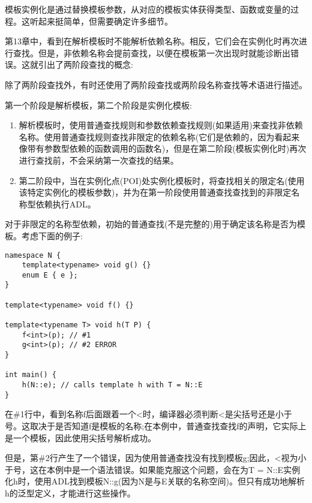 
模板实例化是通过替换模板参数，从对应的模板实体获得类型、函数或变量的过程。这听起来挺简单，但需要确定许多细节。


第13章中，看到在解析模板时不能解析依赖名称。相反，它们会在实例化时再次进行查找。但是，非依赖名称会提前查找，以便在模板第一次出现时就能诊断出错误。这就引出了两阶段查找的概念:

\begin{tcolorbox}[colback=webgreen!5!white,colframe=webgreen!75!black]
\hspace*{0.75cm}除了两阶段查找外，有时还使用了两阶段查找或两阶段名称查找等术语进行描述。
\end{tcolorbox}

第一个阶段是解析模板，第二个阶段是实例化模板:

\begin{enumerate}
\item 
解析模板时，使用普通查找规则和参数依赖查找规则(如果适用)来查找非依赖名称。使用普通查找规则查找非限定的依赖名称(它们是依赖的，因为看起来像带有参数型依赖的函数调用的函数名)，但是在第二阶段(模板实例化时)再次进行查找前，不会采纳第一次查找的结果。

\item 
第二阶段中，当在实例化点(POI)处实例化模板时，将查找相关的限定名(使用该特定实例化的模板参数)，并为在第一阶段使用普通查找查找到的非限定名称型依赖执行ADL。
\end{enumerate}

对于非限定的名称型依赖，初始的普通查找(不是完整的)用于确定该名称是否为模板。考虑下面的例子:

\begin{lstlisting}[style=styleCXX]
namespace N {
	template<typename> void g() {}
	enum E { e };
}

template<typename> void f() {}

template<typename T> void h(T P) {
	f<int>(p); // #1
	g<int>(p); // #2 ERROR
}

int main() {
	h(N::e); // calls template h with T = N::E
}
\end{lstlisting}

在\#1行中，看到名称f后面跟着一个<时，编译器必须判断<是尖括号还是小于号。这取决于是否知道f是模板的名称;在本例中，普通查找查找f的声明，它实际上是一个模板，因此使用尖括号解析成功。

但是，第\#2行产生了一个错误，因为使用普通查找没有找到模板g;因此，<视为小于号，这在本例中是一个语法错误。如果能克服这个问题，会在为T = N::E实例化h时，使用ADL找到模板N::g(因为N是与E关联的名称空间)。但只有成功地解析h的泛型定义，才能进行这些操作。

